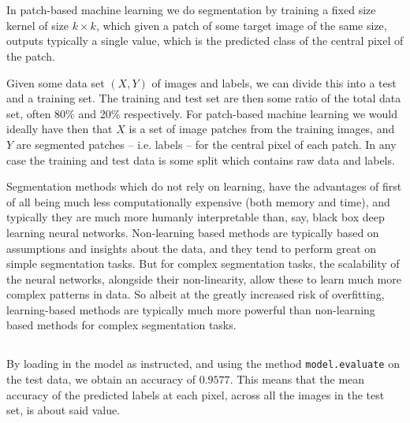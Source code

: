 \section{} %

\subsection{} %

In patch-based machine learning we do segmentation by training a fixed size kernel
of size $k \times k$, which given a patch of some target image of the same size,
outputs typically a single value, which is the predicted class of the central pixel of the patch.

Given some data set $(X, Y)$ of images and labels, we can divide this into a test and a training set.
The training and test set are then some ratio of the total data set, often 80\% and 20\% respectively.
For patch-based machine learning we would ideally have then that $X$ is a set of
image patches from the training images, and $Y$ are segmented patches -- i.e. labels -- for the central pixel of each patch.
In any case the training and test data is some split which contains raw data and labels.

Segmentation methods which do not rely on learning, have the advantages of first of all being
much less computationally expensive (both memory and time),
and typically they are much more humanly interpretable than, say, black box deep learning neural networks.
Non-learning based methods are typically based on assumptions and insights about the data,
and they tend to perform great on simple segmentation tasks.
But for complex segmentation tasks, the scalability of the neural networks, alongside their
non-linearity, allow these to learn much more complex patterns in data.
So albeit at the greatly increased risk of overfitting, learning-based methods 
are typically much more powerful than non-learning based methods for complex segmentation tasks.


\subsection{} %

By loading in the model as instructed, and using the method \texttt{model.evaluate}
on the test data, we obtain an accuracy of $0.9577$.
This means that the mean accuracy of the predicted labels at each pixel,
across all the images in the test set, is about said value.

